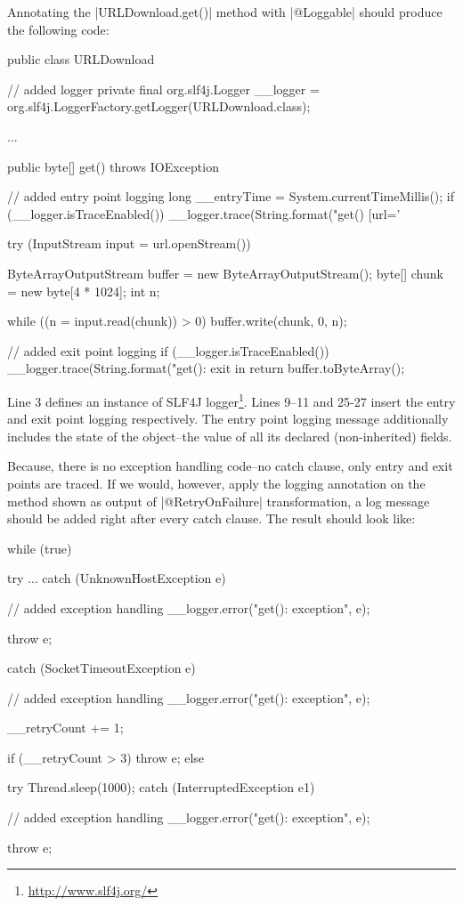 Annotating the \javainline|URLDownload.get()| method with \javainline|@Loggable| should produce the following code:
%
\begin{javacode}
public class URLDownload {
  // added logger
  private final org.slf4j.Logger __logger = org.slf4j.LoggerFactory.getLogger(URLDownload.class);

  ...

  public byte[] get() throws IOException {
    // added entry point logging
    long __entryTime = System.currentTimeMillis();
    if (__logger.isTraceEnabled()) {
      __logger.trace(String.format("get() [url='%
    }

    try (InputStream input = url.openStream()) {

      ByteArrayOutputStream buffer = new ByteArrayOutputStream();
      byte[] chunk = new byte[4 * 1024];
      int n;

      while ((n = input.read(chunk)) > 0) {
        buffer.write(chunk, 0, n);
      }

      // added exit point logging
      if (__logger.isTraceEnabled()) {
        __logger.trace(String.format("get(): exit in %
      }
      return buffer.toByteArray();
    }
  }
}
\end{javacode}

Line 3 defines an instance of SLF4J logger\footnote{\url{http://www.slf4j.org/}}.
Lines 9--11 and 25-27 insert the entry and exit point logging respectively.
The entry point logging message additionally includes the state of the object--\Ie the value of all its declared (non-inherited) fields.

Because, there is no exception handling code--\Ie no catch clause, only entry and exit points are traced.
If we would, however, apply the logging annotation on the method shown as output of \javainline|@RetryOnFailure| transformation, a log message should be added right after every catch clause.
The result should look like:
%
\begin{javacode}
while (true) {
  try {
    ...
  } catch (UnknownHostException e) {
    // added exception handling
    __logger.error("get(): exception", e);

    throw e;
  } catch (SocketTimeoutException e) {
    // added exception handling
    __logger.error("get(): exception", e);

    __retryCount += 1;

    if (__retryCount > 3) {
      throw e;
    } else {
      try {
        Thread.sleep(1000);
      } catch (InterruptedException e1) {
        // added exception handling
        __logger.error("get(): exception", e);

        throw e;
      }
    }
  }
}
\end{javacode}

